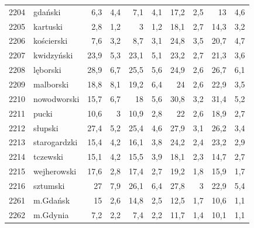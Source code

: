\begin{center}
\begin{longtable}{lp{3cm}rrrrrrrr}
2204 & gdański                 & 6,3     & 4,4         & 7,1      & 4,1          & 17,2     & 2,5          & 13       & 4,6          \\
2205 & kartuski                & 2,8     & 1,2         & 3        & 1,2          & 18,1     & 2,7          & 14,3     & 3,2          \\
2206 & kościerski              & 7,6     & 3,2         & 8,7      & 3,1          & 24,8     & 3,5          & 20,7     & 4,7          \\
2207 & kwidzyński              & 23,9    & 5,3         & 23,1     & 5,1          & 23,2     & 2,7          & 21,3     & 3,6          \\
2208 & lęborski                & 28,9    & 6,7         & 25,5     & 5,6          & 24,9     & 2,6          & 26,7     & 6,1          \\
2209 & malborski               & 18,8    & 8,1         & 19,2     & 6,4          & 24       & 2,6          & 22,9     & 3,5          \\
2210 & nowodworski             & 15,7    & 6,7         & 18       & 5,6          & 30,8     & 3,2          & 31,4     & 5,2          \\
2211 & pucki                   & 10,6    & 3           & 10,9     & 2,8          & 22       & 2,6          & 18,9     & 2,7          \\
2212 & słupski                 & 27,4    & 5,2         & 25,4     & 4,6          & 27,9     & 3,1          & 26,2     & 3,4          \\
2213 & starogardzki            & 15,4    & 4,2         & 16,1     & 3,8          & 24,2     & 2,4          & 23,2     & 2,9          \\
2214 & tczewski                & 15,1    & 4,2         & 15,5     & 3,9          & 18,1     & 2,3          & 14,7     & 2,7          \\
2215 & wejherowski             & 17,6    & 2,8         & 17,4     & 2,7          & 19,2     & 1,8          & 15,9     & 1,7          \\
2216 & sztumski                & 27      & 7,9         & 26,1     & 6,4          & 27,8     & 3            & 22,9     & 5,4          \\
2261 & m.Gdańsk                & 15      & 2,6         & 14,8     & 2,5          & 12,5     & 1,7          & 10,6     & 1,1          \\
2262 & m.Gdynia                & 7,2     & 2,2         & 7,4      & 2,2          & 11,7     & 1,4          & 10,1     & 1,1          \\

\end{longtable}
\end{center}
